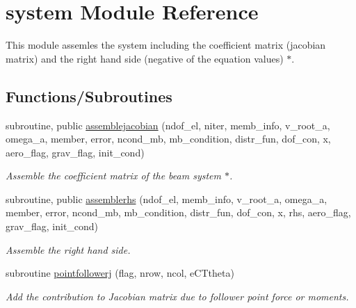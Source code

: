 \hypertarget{namespacesystem}{}\section{system Module Reference}
\label{namespacesystem}


This module assemles the system including the coefficient matrix (jacobian matrix) and the right hand side (negative of the equation values) $\ast$.  


\subsection*{Functions/\+Subroutines}
\begin{DoxyCompactItemize}
\item 
subroutine, public \hyperlink{namespacesystem_aca86d62bded01533c138c9e2298cc804}{assemblejacobian} (ndof\+\_\+el, niter, memb\+\_\+info, v\+\_\+root\+\_\+a, omega\+\_\+a, member, error, ncond\+\_\+mb, mb\+\_\+condition, distr\+\_\+fun, dof\+\_\+con, x, aero\+\_\+flag, grav\+\_\+flag, init\+\_\+cond)
\begin{DoxyCompactList}\small\item\em Assemble the coefficient matrix of the beam system $\ast$. \end{DoxyCompactList}\item 
subroutine, public \hyperlink{namespacesystem_a442f9666f95d674029a7fbe213b47f8a}{assemblerhs} (ndof\+\_\+el, memb\+\_\+info, v\+\_\+root\+\_\+a, omega\+\_\+a, member, error, ncond\+\_\+mb, mb\+\_\+condition, distr\+\_\+fun, dof\+\_\+con, x, rhs, aero\+\_\+flag, grav\+\_\+flag, init\+\_\+cond)
\begin{DoxyCompactList}\small\item\em Assemble the right hand side. \end{DoxyCompactList}\item 
subroutine \hyperlink{namespacesystem_a048a8c1a606cebab7e33f3ae1877c31a}{pointfollowerj} (flag, nrow, ncol, e\+C\+Ttheta)
\begin{DoxyCompactList}\small\item\em Add the contribution to Jacobian matrix due to follower point force or moments. \end{DoxyCompactList}\end{DoxyCompactItemize}
